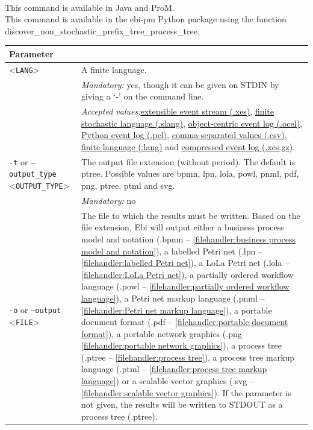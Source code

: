 {\\This command is available in Java and ProM.
\\This command is available in the ebi-pm Python package using the function discover\_non\_stochastic\_prefix\_tree\_process\_tree.
\begin{tabularx}{\linewidth}{lX}
\toprule
Parameter \\\midrule
<\texttt{LANG}>&A finite language.\\
&\textit{Mandatory:} \quad yes, though it can be given on STDIN by giving a `-' on the command line.\\
&\textit{Accepted values:}\quad \hyperref[filehandler:extensible event stream]{extensible event stream (.xes)}, \hyperref[filehandler:finite stochastic language]{finite stochastic language (.slang)}, \hyperref[filehandler:object-centric event log]{object-centric event log (.ocel)}, \hyperref[filehandler:Python event log]{Python event log (.pel)}, \hyperref[filehandler:comma-separated values]{comma-separated values (.csv)}, \hyperref[filehandler:finite language]{finite language (.lang)} and \hyperref[filehandler:compressed event log]{compressed event log (.xes.gz)}.\\
\texttt{-t} or \texttt{--output\_type} <\texttt{OUTPUT\_TYPE}> &
The output file extension (without period). The default is ptree. Possible values are bpmn, lpn, lola, powl, pnml, pdf, png, ptree, ptml and svg.\\
&\textit{Mandatory:} \quad no\\
\texttt{-o} or \texttt{--output} <\texttt{FILE}> &
The file to which the results must be written. Based on the file extension, Ebi will output either a business process model and notation (.bpmn -- \cref{filehandler:business process model and notation}), a labelled Petri net (.lpn -- \cref{filehandler:labelled Petri net}), a LoLa Petri net (.lola -- \cref{filehandler:LoLa Petri net}), a partially ordered workflow language (.powl -- \cref{filehandler:partially ordered workflow language}), a Petri net markup language (.pnml -- \cref{filehandler:Petri net markup language}), a portable document format (.pdf -- \cref{filehandler:portable document format}), a portable network graphics (.png -- \cref{filehandler:portable network graphics}), a process tree (.ptree -- \cref{filehandler:process tree}), a process tree markup language (.ptml -- \cref{filehandler:process tree markup language}) or a scalable vector graphics (.svg -- \cref{filehandler:scalable vector graphics}).
If the parameter is not given, the results will be written to STDOUT as a process tree (.ptree).\\

\end{tabularx}}
